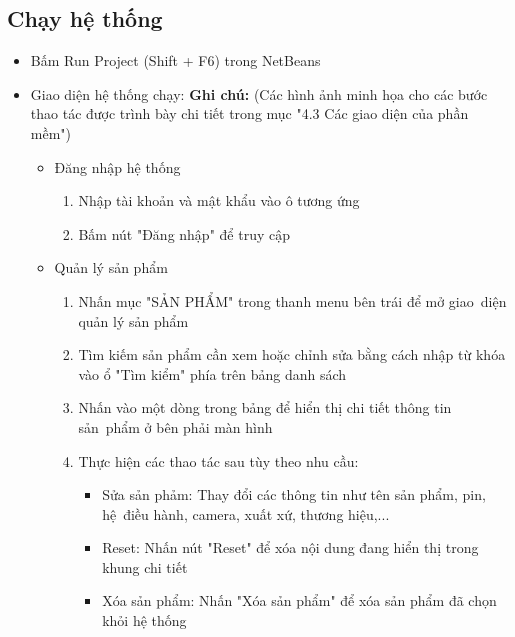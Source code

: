 \documentclass[a4paper,12pt]{report}
\begin{document}
\subsection{Chạy hệ thống}
\begin{itemize}
    \item Bấm Run Project (Shift + F6) trong NetBeans
    \item Giao diện hệ thống chạy: \newline
          \textbf{Ghi chú:} (Các hình ảnh minh họa cho các bước thao tác được trình bày chi tiết trong mục "4.3 Các giao diện của phần mềm") \newline
          \begin{itemize}
              \item Đăng nhập hệ thống
                    \begin{enumerate}[label=B\arabic*:]
                        \item Nhập tài khoản và mật khẩu vào ô tương ứng
                        \item Bấm nút "Đăng nhập" để truy cập
                    \end{enumerate}
              \item Quản lý sản phẩm
                    \begin{enumerate}[label=B\arabic*:]
                        \item Nhấn mục "SẢN PHẨM" trong thanh menu bên trái để mở giao~diện quản lý sản phẩm
                        \item Tìm kiếm sản phẩm cần xem hoặc chỉnh sửa bằng cách nhập từ khóa vào ổ "Tìm kiểm" phía trên bảng danh sách
                        \item Nhấn vào một dòng trong bảng để hiển thị chi tiết thông tin sản~phẩm ở bên phải màn hình
                        \item Thực hiện các thao tác sau tùy theo nhu cầu:
                              \begin{itemize}
                                  \item Sửa sản phảm: Thay đổi các thông tin như tên sản phẩm, pin, hệ~điều hành, camera, xuất xứ, thương hiệu,...
                                  \item Reset: Nhấn nút "Reset" để xóa nội dung đang hiển thị trong khung chi tiết
                                  \item Xóa sản phẩm: Nhấn "Xóa sản phẩm" để xóa sản phẩm đã chọn khỏi hệ thống
                              \end{itemize}

\end{enumerate}
\end{itemize}
\end{itemize}
\end{document}
